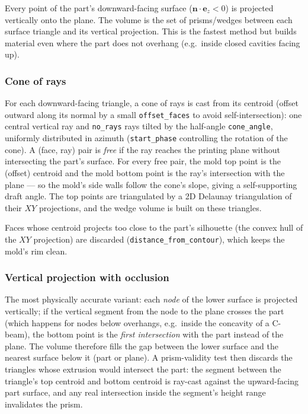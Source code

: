 Every point of the part's downward-facing surface
($\mathbf{n}\cdot\mathbf{e}_z < 0$) is projected vertically onto the
plane. The volume is the set of prisms/wedges between each surface
triangle and its vertical projection. This is the fastest method but
builds material even where the part does not overhang (e.g.\ inside
closed cavities facing up).

\subsubsection{Cone of rays}

For each downward-facing triangle, a cone of rays is cast from its
centroid (offset outward along its normal by a small
\texttt{offset\_faces} to avoid self-intersection): one central
vertical ray and \texttt{no\_rays} rays tilted by the half-angle
\texttt{cone\_angle}, uniformly distributed in azimuth
(\texttt{start\_phase} controlling the rotation of the cone). A
(face, ray) pair is \emph{free} if the ray reaches the printing plane
without intersecting the part's surface. For every free pair, the mold
top point is the (offset) centroid and the mold bottom point is the
ray's intersection with the plane --- so the mold's side walls follow
the cone's slope, giving a self-supporting draft angle. The top points
are triangulated by a 2D Delaunay triangulation of their $XY$
projections, and the wedge volume is built on these triangles.

Faces whose centroid projects too close to the part's silhouette (the
convex hull of the $XY$ projection) are discarded
(\texttt{distance\_from\_contour}), which keeps the mold's rim clean.

\subsubsection{Vertical projection with occlusion}

The most physically accurate variant: each \emph{node} of the
lower surface is projected vertically; if the vertical segment from the
node to the plane crosses the part (which happens for nodes below
overhangs, e.g.\ inside the concavity of a C-beam), the bottom point
is the \emph{first intersection} with the part instead of the plane.
The volume therefore fills the gap between the lower surface and the
nearest surface below it (part or plane). A prism-validity test then
discards the triangles whose extrusion would intersect the part: the
segment between the triangle's top centroid and bottom centroid is
ray-cast against the upward-facing part surface, and any real
intersection inside the segment's height range invalidates the prism.

